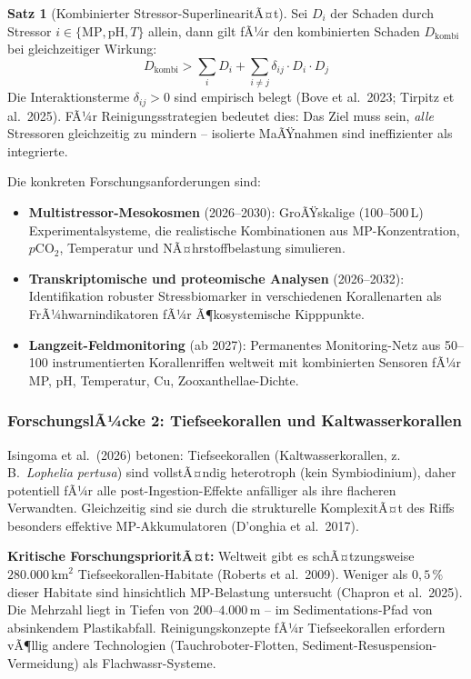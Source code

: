 ﻿\documentclass[12pt,a4paper]{article}
\theoremstyle{definition}
\newtheorem{satz}{Satz}
\theoremstyle{remark}
\begin{document}
\begin{satz}[Kombinierter Stressor-SuperlinearitÃ¤t]
Sei $D_i$ der Schaden durch Stressor $i \in \{\text{MP}, \text{pH}, T\}$ allein,
dann gilt fÃ¼r den kombinierten Schaden $D_{\text{kombi}}$ bei gleichzeitiger
Wirkung:
\begin{equation}
  D_{\text{kombi}} > \sum_i D_i + \sum_{i \neq j} \delta_{ij} \cdot D_i \cdot D_j
  \label{eq:superlinear_damage}
\end{equation}
Die Interaktionsterme $\delta_{ij} > 0$ sind empirisch belegt (Bove et al.\ 2023;
Tirpitz et al.\ 2025). FÃ¼r Reinigungsstrategien bedeutet dies: Das Ziel muss sein,
\textit{alle} Stressoren gleichzeitig zu mindern -- isolierte MaÃŸnahmen sind
ineffizienter als integrierte.
\end{satz}

Die konkreten Forschungsanforderungen sind:
\begin{itemize}[leftmargin=*, noitemsep]
  \item \textbf{Multistressor-Mesokosmen} (2026--2030): GroÃŸskalige (100--500\,L)
    Experimentalsysteme, die realistische Kombinationen aus MP-Konzentration,
    $p$CO$_2$, Temperatur und NÃ¤hrstoffbelastung simulieren.
  \item \textbf{Transkriptomische und proteomische Analysen} (2026--2032):
    Identifikation robuster Stressbiomarker in verschiedenen Korallenarten als
    FrÃ¼hwarnindikatoren fÃ¼r Ã¶kosystemische Kipppunkte.
  \item \textbf{Langzeit-Feldmonitoring} (ab 2027): Permanentes Monitoring-Netz
    aus 50--100 instrumentierten Korallenriffen weltweit mit kombinierten
    Sensoren fÃ¼r MP, pH, Temperatur, Cu, Zooxanthellae-Dichte.
\end{itemize}

\subsubsection{ForschungslÃ¼cke 2: Tiefseekorallen und Kaltwasserkorallen}

Isingoma et al.\ (2026) betonen: Tiefseekorallen (Kaltwasserkorallen, z.\,B.\
\textit{Lophelia pertusa}) sind vollstÃ¤ndig heterotroph (kein Symbiodinium),
daher potentiell fÃ¼r alle post-Ingestion-Effekte anf\"alliger als ihre flacheren
Verwandten. Gleichzeitig sind sie durch die strukturelle KomplexitÃ¤t des Riffs
besonders effektive MP-Akkumulatoren (D'onghia et al.\ 2017).

\begin{mdframed}[backgroundcolor=lightgray, linecolor=alertred, linewidth=1.2pt]
\textbf{Kritische ForschungsprioritÃ¤t:} Weltweit gibt es schÃ¤tzungsweise
$280{.}000\,\text{km}^2$ Tiefseekorallen-Habitate (Roberts et al.\ 2009).
Weniger als $0{,}5\,\%$ dieser Habitate sind hinsichtlich MP-Belastung
untersucht (Chapron et al.\ 2025). Die Mehrzahl liegt in Tiefen von
$200$--$4.000$\,m -- im Sedimentations-Pfad von absinkendem Plastikabfall.
Reinigungskonzepte fÃ¼r Tiefseekorallen erfordern vÃ¶llig andere Technologien
(Tauchroboter-Flotten, Sediment-Resuspension-Vermeidung) als Flachwassr-Systeme.
\end{mdframed}
\end{document}
